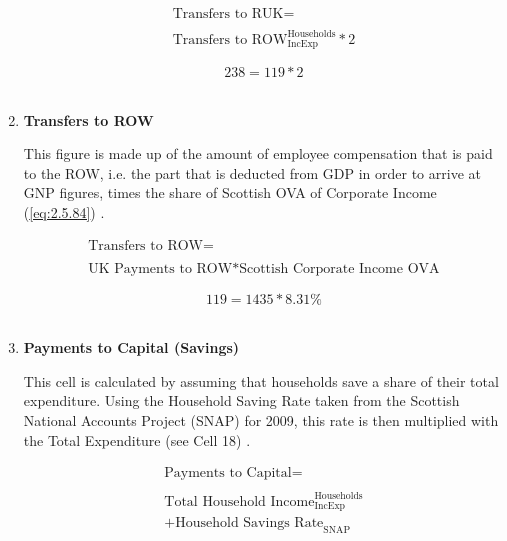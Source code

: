 \begin{enumerate}
\begin{equation}
\begin{split}
\text{Transfers to RUK} =  \\ \\
\text{Transfers to ROW}^\text{Households}_\text{IncExp}*2
\end{split} \label{eq:2.5.18}
\end{equation}

\begin{equation} \nonumber
238 = 119*2
\end{equation}\\


\item \textbf {Transfers to ROW}

This figure is made up of the amount of employee compensation that is paid to the ROW, i.e. the part that is deducted from GDP in order to arrive at GNP figures, times the share of Scottish OVA of Corporate Income (\ref{eq:2.5.84}) \cite{ONS2011c}.

\begin{equation}
\begin{split}
\text{Transfers to ROW} =  \\ \\
\text{UK Payments to ROW}*\text{Scottish Corporate Income OVA}
\end{split} \label{eq:2.5.19}
\end{equation}

\begin{equation} \nonumber
119 = 1435*8.31\%
\end{equation}\\


\item \textbf {Payments to Capital (Savings)}

This cell is calculated by assuming that households save a share of their total expenditure. Using the Household Saving Rate taken from the Scottish National Accounts Project (SNAP) for  2009\cite{ScotGov2013c}, this rate is then multiplied with the Total Expenditure (see Cell 18) .

\begin{equation}
\begin{split}
\text{Payments to Capital} =  \\ \\
\text{Total Household Income}^\text{Households}_\text{IncExp}\\
+\text{Household Savings Rate}_\text{SNAP}
\end{split} \label{eq:2.5.20}
\end{equation}


\end{enumerate}
